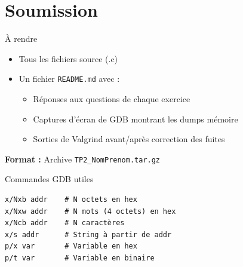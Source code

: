 \documentclass[10pt,a4paper]{article}
\begin{document}
\section{Soumission}

\begin{infobox}{À rendre}
\begin{itemize}
    \item Tous les fichiers source (.c)
    \item Un fichier \texttt{README.md} avec :
    \begin{itemize}
        \item Réponses aux questions de chaque exercice
        \item Captures d'écran de GDB montrant les dumps mémoire
        \item Sorties de Valgrind avant/après correction des fuites
    \end{itemize}
\end{itemize}

\textbf{Format :} Archive \texttt{TP2\_NomPrenom.tar.gz}
\end{infobox}

\begin{infobox}{Commandes GDB utiles}
\begin{verbatim}
x/Nxb addr    # N octets en hex
x/Nxw addr    # N mots (4 octets) en hex
x/Ncb addr    # N caractères
x/s addr      # String à partir de addr
p/x var       # Variable en hex
p/t var       # Variable en binaire
\end{verbatim}
\end{infobox}
\end{document}
